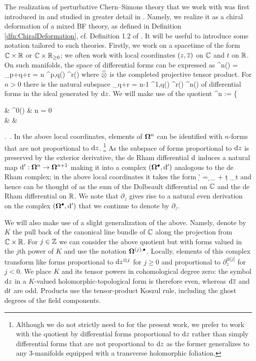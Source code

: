\documentclass[11pt]{amsart}
\numberwithin{equation}{section}
\numberwithin{figure}{section}
\numberwithin{table}{section}
\begin{document}
The realization of perturbative Chern--Simons theory that we work with was first introduced in \cite{Aganagic:2017tvx} and studied in greater detail in \cite{Gwilliam:2019cbp}.
Namely, we realize it as a chiral deformation of a mixed BF theory, as defined in Definition \ref{dfn:ChiralDeformation}, cf. Definition 1.2 of \cite{Gwilliam:2019cbp}.
It will be useful to introduce some notation tailored to such theories.
Firstly, we work on a spacetime of the form ${\mathbb C} \times {\mathbb R}$ or ${\mathbb C} \times {\mathbb R}_{\geq 0}$; we often work with local coordinates $(z,{\overline{z}})$ on ${\mathbb C}$ and $t$ on ${\mathbb R}$.
On such manifolds, the space of differential forms can be expressed as
\be
	\Omega^n(\C \times \R) = \bigoplus_{p+q+r = n} \Omega^{p,q}(\C) \wh{\otimes} \Omega^r(\R)
\ee
where $\widehat{\otimes}$ is the completed projective tensor product.
For $n > 0$ there is the natural subspace
\be
	\bigoplus_{q+r = n-1} \Omega^{1,q}(\C) \wh{\otimes} \Omega^r(\R) \subset \Omega^n(\C \times \R)
\ee
of differential forms in the ideal generated by $\mathrm{d} z$.
We will make use of the quotient
\be
	\bOmega^n := \left\{\begin{aligned}& \Omega^0(\C \times \R) & n = 0\\
		&  & 
	\end{aligned}\right.~.
\ee
In the above local coordinates, elements of $\mathbf{\Omega}^n$ can be identified with $n$-forms that are not proportional to $\mathrm{d} z$.%
%
\footnote{Although we do not strictly need to for the present work, we prefer to work with the quotient by differential forms proportional to $\mathrm{d} z$ rather than simply differential forms that are not proportional to $\mathrm{d} z$ as the former generalizes to any 3-manifolds equipped with a transverse holomorphic foliation.} %
%
As the subspace of forms proportional to $\mathrm{d} z$ is preserved by the exterior derivative, the de Rham differential $\mathrm{d}$ induces a natural map $\mathrm{d}': \mathbf{\Omega}^n \to \mathbf{\Omega}^{n+1}$ making it into a complex $(\mathbf{\Omega}^\bullet, \mathrm{d}')$ analogous to the de Rham complex; in the above local coordinates it takes the form
\be
	\d' = \d \oz \partial_{\oz} + \d t \partial_t
\ee
and hence can be thought of as the sum of the Dolbeault differential on ${\mathbb C}$ and the de Rham differential on ${\mathbb R}$.
We note that $\partial_z$ gives rise to a natural even derivation on the complex $(\mathbf{\Omega}^\bullet, \mathrm{d}')$ that we continue to denote by $\partial_z$.

We will also make use of a slight generalization of the above.
Namely, denote by $K$ the pull back of the canonical line bundle of ${\mathbb C}$ along the projection from ${\mathbb C} \times {\mathbb R}$.
For $j \in {\mathbb Z}$ we can consider the above quotient but with forms valued in the $j$th power of $K$ and use the notation $\mathbf{\Omega}^{(j),\bullet}$.
Locally, elements of this complex transform like forms proportional to $\mathrm{d} z^{\otimes j}$ for $j \geq 0$ and proportional to $\partial_z^{\otimes |j|}$ for $j < 0$.
We place $K$ and its tensor powers in cohomological degree zero: the symbol $\mathrm{d} z$ in a $K$-valued holomorphic-topological form is therefore even, whereas $\mathrm{d}{\overline{z}}$ and $\mathrm{d} t$ are odd.
Products use the tensor-product Koszul rule, including the ghost degrees of the field components.
\end{document}
